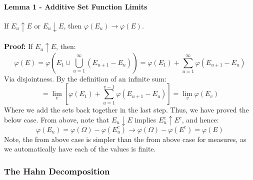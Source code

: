 \documentclass[12pt,a4paper]{article}
\newcommand{\1}[1]{\mathbbm{1}\left\{ #1 \right\}}
\begin{document}
\paragraph{Lemma 1 - Additive Set Function Limits} If $E_u \uparrow E$ or $E_u \downarrow E$, then $\varphi(E_u) \to \varphi(E)$.
\\\\
\textbf{Proof:} If $E_u \uparrow E$, then:
$$
	\varphi(E) = \varphi\left(E_1 \cup \bigcup_{u=1}^\infty (E_{u+1} - E_u)\right)
	= \varphi(E_1) + \sum_{u=1}^\infty \varphi(E_{u+1} - E_u)
$$
Via disjointness. By the definition of an infinite sum:
$$
	= \lim_v \left[\varphi(E_1) + \sum_{u=1}^{v - 1} \varphi(E_{u+1} - E_u)\right] =
	\lim_v \varphi(E_v)
$$
Where we add the sets back together in the last step. Thus, we have proved the below case. From above, note that $E_u \downarrow E$ implies $E_u^c \uparrow E^c$, and hence:
$$
	\varphi(E_u) = \varphi(\Omega) - \varphi(E_u^c) \to \varphi(\Omega) - \varphi(E^c) = \varphi(E)
$$
Note, the from above case is simpler than the from above case for measures, as we automatically have each of the values is finite.

\subsubsection{The Hahn Decomposition}
\end{document}
